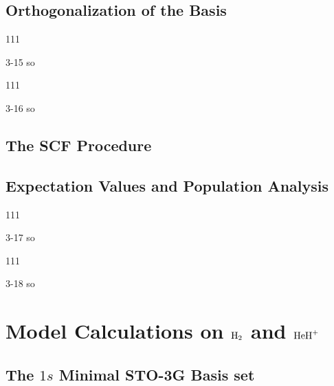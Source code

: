 \documentclass[a4paper]{book}
\begin{document}
	\subsection{Orthogonalization of the Basis}
	
	\begin{exercise}
	111
	\end{exercise}
	
	\begin{solution}
		3-15 so
	\end{solution}
	
	\begin{exercise}
	111
	\end{exercise}
	
	\begin{solution}
		3-16 so
	\end{solution}

	\subsection{The SCF Procedure}
	
	\subsection{Expectation Values and Population Analysis}
	
	\begin{exercise}
	111
	\end{exercise}
	
	\begin{solution}
		3-17 so
	\end{solution}
	
	\begin{exercise}
	111
	\end{exercise}
	
	\begin{solution}
		3-18 so
	\end{solution}
	
	\section{Model Calculations on \texorpdfstring{$\ce{H2}$}- and \texorpdfstring{$\ce{HeH+}$}-}
	
	\subsection{The \texorpdfstring{$1s$}- Minimal STO-3G Basis set}
	
\end{document}
